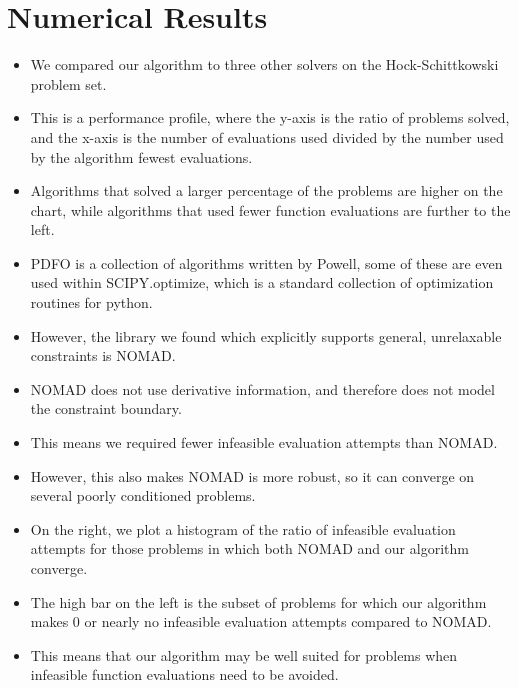 \documentclass{article}
\begin{document}
	\section{Numerical Results}
\begin{itemize}
\item We compared our algorithm to three other solvers on the Hock-Schittkowski problem set.
\item This is a performance profile, where the y-axis is the ratio of problems solved, and the x-axis is the number of evaluations used divided by the number used by the algorithm fewest evaluations.
\item Algorithms that solved a larger percentage of the problems are higher on the chart, while algorithms that used fewer function evaluations are further to the left.
\item PDFO is a collection of algorithms written by Powell, some of these are even used within SCIPY.optimize, which is a standard collection of optimization routines for python.
\item However, the library we found which explicitly supports general, unrelaxable constraints is NOMAD.
\item NOMAD does not use derivative information, and therefore does not model the constraint boundary.
\item This means we required fewer infeasible evaluation attempts than NOMAD.
\item However, this also makes NOMAD is more robust, so it can converge on several poorly conditioned problems.
\item On the right, we plot a histogram of the ratio of infeasible evaluation attempts for those problems in which both NOMAD and our algorithm converge.
\item The high bar on the left is the subset of problems for which our algorithm makes 0 or nearly no infeasible evaluation attempts compared to NOMAD.
\item This means that our algorithm may be well suited for problems when infeasible function evaluations need to be avoided.
\end{itemize}
\end{document}
